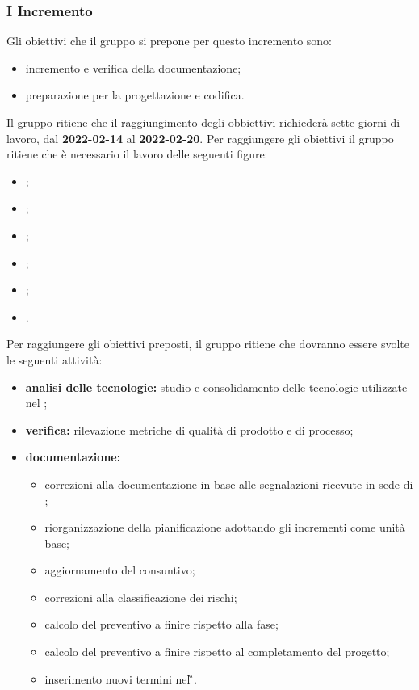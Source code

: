 \subsubsection{I Incremento}
Gli obiettivi che il gruppo si prepone per questo incremento sono:
\begin{itemize}
	\item incremento e verifica della documentazione;
	\item preparazione per la progettazione e codifica.
\end{itemize}
Il gruppo ritiene che il raggiungimento degli obbiettivi richiederà sette giorni di lavoro, dal \textbf{2022-02-14} al \textbf{2022-02-20}.
Per raggiungere gli obiettivi il gruppo ritiene che è necessario il lavoro delle seguenti figure:
\begin{itemize}
	\item \RE{};
 	\item \AM{};
  	\item \AN{};
   	\item \PR{};
   	\item \PT{};
   	\item \VE{}.
\end{itemize}
Per raggiungere gli obiettivi preposti, il gruppo ritiene che dovranno essere svolte le seguenti attività:
\begin{itemize}
	\item \textbf{analisi delle tecnologie:} studio e consolidamento delle tecnologie utilizzate nel \PoC{};
 	\item \textbf{verifica:} rilevazione metriche di qualità di prodotto e di processo;
	 \item \textbf{documentazione:} 
	 \begin{itemize}
		 \item correzioni alla documentazione in base alle segnalazioni ricevute in sede di \RTB{};
		   \item riorganizzazione della pianificazione adottando gli incrementi come
		   unità base;
		   \item aggiornamento del consuntivo;
		  \item correzioni alla classificazione dei rischi;
		  \item calcolo del preventivo a finire rispetto alla fase;
			\item calcolo del preventivo a finire rispetto al completamento del progetto;  
		   \item inserimento nuovi termini nel \G{}.
	 \end{itemize}
\end{itemize}

